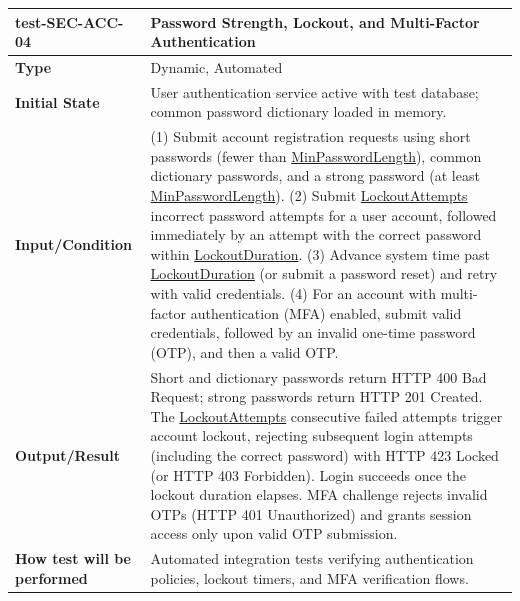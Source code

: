 \documentclass[12pt, titlepage]{article}
\newcommand{\const}[1]{\hyperlink{const:#1}{\textsf{#1}}}
\begin{document}
\vspace{1em}

\noindent\begin{tabularx}{\textwidth}{>{\raggedright\arraybackslash}p{3.5cm}X}
  \toprule
  \textbf{test-SEC-ACC-04} & \textbf{Password Strength, Lockout, and Multi-Factor Authentication}\\
  \midrule
  \textbf{Type} & Dynamic, Automated\\
  \textbf{Initial State} & User authentication service active with test database; common password dictionary loaded in memory.\\
  \textbf{Input/Condition} & (1) Submit account registration requests using short passwords (fewer than \const{MinPasswordLength}), common dictionary passwords, and a strong password (at least \const{MinPasswordLength}). (2) Submit \const{LockoutAttempts} incorrect password attempts for a user account, followed immediately by an attempt with the correct password within \const{LockoutDuration}. (3) Advance system time past \const{LockoutDuration} (or submit a password reset) and retry with valid credentials. (4) For an account with multi-factor authentication (MFA) enabled, submit valid credentials, followed by an invalid one-time password (OTP), and then a valid OTP.\\
  \textbf{Output/Result} & Short and dictionary passwords return HTTP 400 Bad Request; strong passwords return HTTP 201 Created. The \const{LockoutAttempts} consecutive failed attempts trigger account lockout, rejecting subsequent login attempts (including the correct password) with HTTP 423 Locked (or HTTP 403 Forbidden). Login succeeds once the lockout duration elapses. MFA challenge rejects invalid OTPs (HTTP 401 Unauthorized) and grants session access only upon valid OTP submission.\\
  \textbf{How test will be performed} & Automated integration tests verifying authentication policies, lockout timers, and MFA verification flows.\\
  \bottomrule
\end{tabularx}

\vspace{1em}
\end{document}
